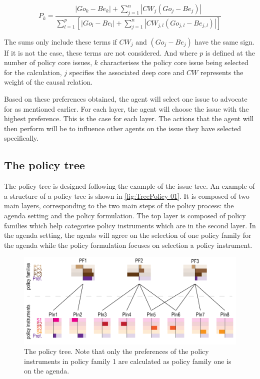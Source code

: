 \documentclass[11pt]{article}
\begin{document}
\begin{equation}\label{eq:preference2}
P_k= \frac{ |Go_k - Be_k| + \sum_{j=1}^n |CW_j \left( Go_j - Be_j \right)|}{\sum_{l=1}^p \left[ |Go_l - Be_l| + \sum_{j=1}^n \left|CW_{j,l} \left( Go_{j,l} - Be_{j,l} \right) \right| \right]}
\end{equation}

The sums only include these terms if $CW_j$ and $\left( Go_j - Be_j \right)$ have the same sign. If it is not the case, these terms are not considered. And where $p$ is defined at the number of policy core issues, $k$ characterises the policy core issue being selected for the calculation, $j$ specifies the associated deep core and $CW$ represents the weight of the causal relation.

Based on these preferences obtained, the agent will select one issue to advocate for as mentioned earlier. For each layer, the agent will choose the issue with the highest preference. This is the case for each layer. The actions that the agent will then perform will be to influence other agents on the issue they have selected specifically.

\subsection{The policy tree}
\label{ssec:policyTree}

The policy tree is designed following the example of the issue tree. An example of a structure of a policy tree is shown in \autoref{fig:TreePolicy-01}. It is composed of two main layers, corresponding to the two main steps of the policy process: the agenda setting and the policy formulation. The top layer is composed of policy families which help categorise policy instruments which are in the second layer. In the agenda setting, the agents will agree on the selection of one policy family for the agenda while the policy formulation focuses on selection a policy instrument.

\begin{figure}
\centering
\includegraphics[width = \linewidth, angle = 0]{figures/TreePolicy-01}
\caption{The policy tree. Note that only the preferences of the policy instruments in policy family 1 are calculated as policy family one is on the agenda.}
\label{fig:TreePolicy-01}
\end{figure}
\end{document}
